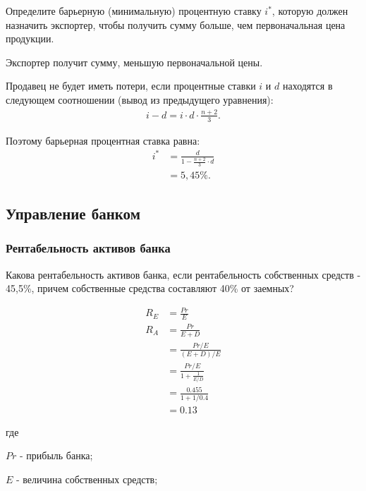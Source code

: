 \documentclass[12pt, table, a4paper,twoside]{exam}
\begin{document}
\begin{questions}
\begin{subparts}
	Определите барьерную (минимальную) процентную ставку $i^*$, которую должен назначить экспортер, чтобы получить сумму больше, чем первоначальная цена продукции.
	
	\begin{solution}[12em]
		
		Экспортер получит сумму, меньшую первоначальной цены. 
		
		Продавец не будет иметь потери, если процентные ставки $i$ и $d$ находятся в следующем соотношении (вывод из предыдущего уравнения):
		\begin{align}
		i-d=i \cdot d \cdot \frac{n+2}{3}.
		\end{align}
		
		Поэтому барьерная процентная ставка равна:
		\begin{align}
		i^*&=\frac{d}{1-\frac{n+2}{3} \cdot d}\\
		&=5,45\%.\nonumber
		\end{align}
		
	\end{solution}


	
\end{subparts}
\addpoints

\vfill\null\pagebreak
\subsection{Управление банком}
\subsubsection{Рентабельность активов банка}
\question[10] Какова рентабельность активов банка, если рентабельность собственных средств - 45,5\%, причем собственные средства составляют 40\% от заемных? 

\begin{solution}[12em]
	\begin{align}
	R_E&=\frac{Pr}{E}\\
	R_A&=\frac{Pr}{E+D}\nonumber\\
	&=\frac{Pr/E}{(E+D)/E}\nonumber\\
	&=\frac{Pr/E}{1+\frac{1}{E/D}}\\
	&=\frac{0.455}{1+1/0.4}\nonumber\\
	&=0.13\nonumber
	\end{align}
	\raggedright
	где
	
	$Pr$ - прибыль банка;
	
	$E$ - величина собственных средств;
	

\end{solution}
\end{questions}
\end{document}
